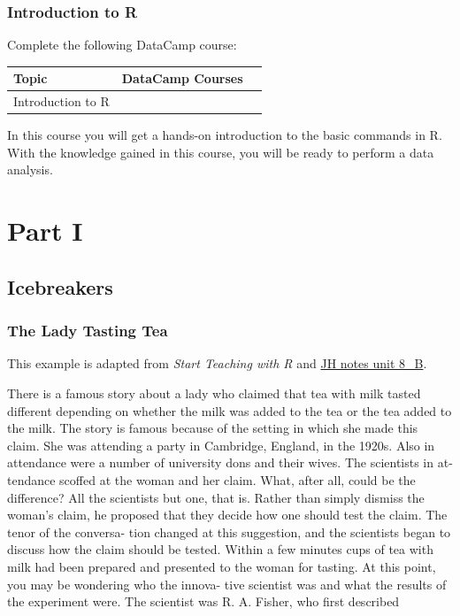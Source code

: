 \documentclass[]{book}
\begin{document}
\section*{Introduction to R}\label{introduction-to-r}

Complete the following DataCamp course:

\begin{longtable}[]{@{}lll@{}}
\toprule
Topic & DataCamp Courses\tabularnewline
\midrule
\endhead
Introduction to R &\tabularnewline
\bottomrule
\end{longtable}

In this course you will get a hands-on introduction to the basic
commands in R. With the knowledge gained in this course, you will be
ready to perform a data analysis.

\part{Part I}\label{part-part-i}

\chapter{Icebreakers}\label{intro}

\section{The Lady Tasting Tea}\label{the-lady-tasting-tea}

This example is adapted from \emph{Start Teaching with R}
\citep{startwithR} and
\href{http://www.medicine.mcgill.ca/epidemiology/hanley/med2/unit8b_epi_nov21.pdf}{JH
notes unit 8\_B}.

There is a famous story about a lady who claimed that tea with milk
tasted different depending on whether the milk was added to the tea or
the tea added to the milk. The story is famous because of the setting in
which she made this claim. She was attending a party in Cambridge,
England, in the 1920s. Also in attendance were a number of university
dons and their wives. The scientists in at- tendance scoffed at the
woman and her claim. What, after all, could be the difference? All the
scientists but one, that is. Rather than simply dismiss the woman's
claim, he proposed that they decide how one should test the claim. The
tenor of the conversa- tion changed at this suggestion, and the
scientists began to discuss how the claim should be tested. Within a few
minutes cups of tea with milk had been prepared and presented to the
woman for tasting. At this point, you may be wondering who the innova-
tive scientist was and what the results of the experiment were. The
scientist was R. A. Fisher, who first described
\end{document}
